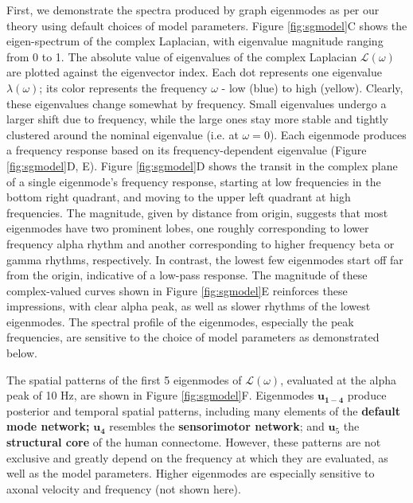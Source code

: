 First, we demonstrate the spectra produced by graph eigenmodes as per
our theory using default choices of model parameters. Figure \ref{fig:sgmodel}C
shows the eigen-spectrum of the complex Laplacian, with eigenvalue
magnitude ranging from 0 to 1. The absolute value of eigenvalues of the
complex Laplacian $\mathcal{L}(\omega)$ are plotted against the
eigenvector index. Each dot represents one eigenvalue
$\lambda(\omega)$; its color represents the frequency $\omega$ - low
(blue) to high (yellow). Clearly, these eigenvalues change somewhat by
frequency. Small eigenvalues undergo a larger shift due to frequency,
while the large ones stay more stable and tightly clustered around the
nominal eigenvalue (i.e. at $\omega = 0$). Each eigenmode produces a
frequency response based on its frequency-dependent eigenvalue
(Figure \ref{fig:sgmodel}D, E). Figure \ref{fig:sgmodel}D shows the transit in the
complex plane of a single eigenmode's frequency response, starting at
low frequencies in the bottom right quadrant, and moving to the upper
left quadrant at high frequencies. The magnitude, given by distance from
origin, suggests that most eigenmodes have two prominent lobes, one
roughly corresponding to lower frequency alpha rhythm and another
corresponding to higher frequency beta or gamma rhythms, respectively.
In contrast, the lowest few eigenmodes start off far from the origin,
indicative of a low-pass response. The magnitude of these complex-valued
curves shown in Figure \ref{fig:sgmodel}E reinforces these impressions, with clear alpha
peak, as well as slower rhythms of the lowest eigenmodes. The spectral
profile of the eigenmodes, especially the peak frequencies, are
sensitive to the choice of model parameters as demonstrated below.

The spatial patterns of the first 5 eigenmodes of
$\mathcal{L}(\omega)$, evaluated at the alpha peak of 10 Hz, are shown
in Figure \ref{fig:sgmodel}F. Eigenmodes
$\mathbf{u}_{\mathbf{1 - 4}}$ produce posterior and temporal spatial
patterns, including many elements of the \textbf{default mode network;}
\(\mathbf{u}_{\mathbf{4}}\) resembles the \textbf{sensorimotor network};
and \(\mathbf{u}_{5}\) the \textbf{structural core} of the human
connectome. However, these patterns are not exclusive and greatly depend
on the frequency at which they are evaluated, as well as the model
parameters. Higher eigenmodes are especially sensitive to axonal
velocity and frequency (not shown here).


